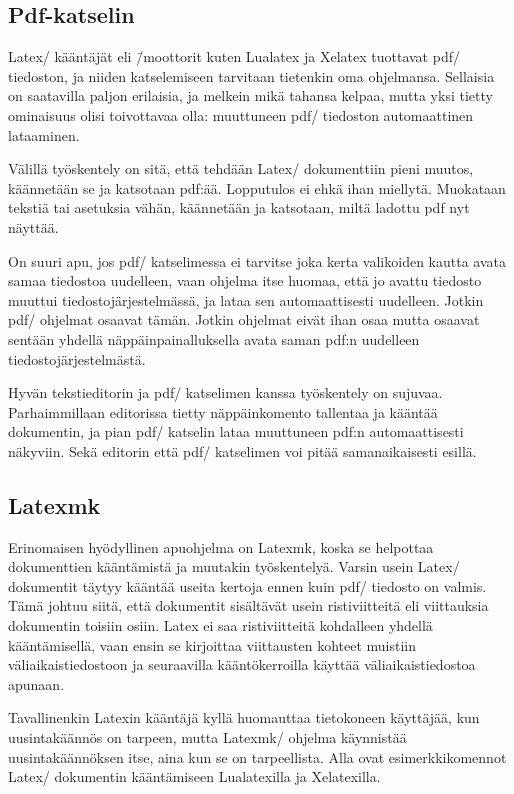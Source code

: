 \subsection{Pdf-katselin}

Latex\-/ kääntäjät eli \=/moottorit kuten Lualatex ja Xelatex tuottavat
pdf\-/ tiedoston, ja niiden katselemiseen tarvitaan tietenkin oma
ohjelmansa. Sellaisia on saatavilla paljon erilaisia, ja melkein mikä
tahansa kelpaa, mutta yksi tietty ominaisuus olisi toivottavaa olla:
muuttuneen pdf\-/ tiedoston automaattinen lataaminen.

Välillä työskentely on sitä, että tehdään Latex\-/ dokumenttiin pieni
muutos, käännetään se ja katsotaan pdf:ää. Lopputulos ei ehkä ihan
miellytä. Muokataan tekstiä tai asetuksia vähän, käännetään ja
katsotaan, miltä ladottu pdf nyt näyttää.

On suuri apu, jos pdf\-/ katselimessa ei tarvitse joka kerta valikoiden
kautta avata samaa tiedostoa uudelleen, vaan ohjelma itse huomaa, että
jo avattu tiedosto muuttui tiedostojärjestelmässä, ja lataa sen
automaattisesti uudelleen. Jotkin pdf\-/ ohjelmat osaavat tämän. Jotkin
ohjelmat eivät ihan osaa mutta osaavat sentään yhdellä
näppäinpainalluksella avata saman pdf:n uudelleen
tiedostojärjestelmästä.

Hyvän tekstieditorin ja pdf\-/ katselimen kanssa työskentely on sujuvaa.
Parhaimmillaan editorissa tietty näppäinkomento tallentaa ja kääntää
dokumentin, ja pian pdf\-/ katselin lataa muuttuneen pdf:n
automaattisesti näkyviin. Sekä editorin että pdf\-/ katselimen voi pitää
samanaikaisesti esillä.

\subsection{Latexmk}
\label{luku/latexmk}

Erinomaisen hyödyllinen apuohjelma on Latexmk, koska se helpottaa
dokumenttien kääntämistä ja muutakin työskentelyä. Varsin usein Latex\-/
dokumentit täytyy kääntää useita kertoja ennen kuin pdf\-/ tiedosto on
valmis. Tämä johtuu siitä, että dokumentit sisältävät usein
ristiviitteitä eli viittauksia dokumentin toisiin osiin. Latex ei saa
ristiviitteitä kohdalleen yhdellä kääntämisellä, vaan ensin se
kirjoittaa viittausten kohteet muistiin väliaikaistiedostoon ja
seuraavilla kääntökerroilla käyttää väliaikaistiedostoa apunaan.

Tavallinenkin Latexin kääntäjä kyllä huomauttaa tietokoneen käyttäjää,
kun uusintakäännös on tarpeen, mutta Latexmk\-/ ohjelma käynnistää
uusintakäännöksen itse, aina kun se on tarpeellista. Alla ovat
esimerkkikomennot Latex\-/ dokumentin kääntämiseen Lualatexilla ja
Xelatexilla.

